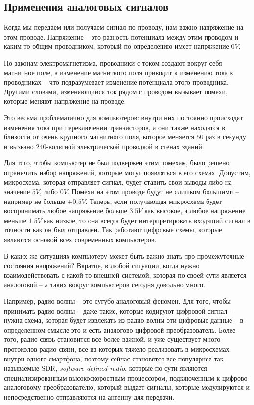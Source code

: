 \documentclass[a4page]{article}
\begin{document}
\subsection{Применения аналоговых сигналов}

Когда мы передаем или получаем сигнал по проводу, нам важно напряжение на этом проводе.
Напряжение -- это разность потенциала между этим проводом и каким-то общим проводником, который по определению имеет напряжение $0V$.

По законам электромагнетизма, проводники с током создают вокруг себя магнитное поле, а изменение магнитного поля приводит к изменению тока в проводниках -- 
что подразумевает изменение потенциала этого проводника.
Другими словами, изменяющийся ток рядом с проводом вызывает помехи, которые меняют напряжение на проводе.

Это весьма проблематично для компьютеров:
внутри них постоянно происходят изменения тока при переключении транзисторов,
а они также находятся в близости от очень крупного магнитного поля, которое меняется 50 раз в секунду и вызвано 240-вольтной электрической проводкой в стенах зданий.

Для того, чтобы компьютер не был подвержен этим помехам, было решено ограничить набор напряжений, которые могут появляться в его схемах.
Допустим, микросхема, которая отправляет сигнал, будет ставить свои выводы либо на значение $5V$, либо $0V$.
Помехи на этом проводе будут не слишком большими -- например не больше $\pm 0.5V$.
Теперь, если получающая микросхема будет воспринимать любое напряжение больше $3.5V$ как высокое,
а любое напряжение меньше $1.5V$ как низкое,
то она всегда будет интерпретировать входящий сигнал в точности как он был отправлен.
Так работают цифровые схемы, которые являются основой всех современных компьютеров.


В каких же ситуациях компьютеру может быть важно знать про промежуточные состояния напряжений?
Вкратце, в любой ситуации, когда нужно взаимодействовать с какой-то внешней системой, которая по своей сути является аналоговой --
а таких вокруг компьютеров сегодня довольно много. 

Например, радио-волны -- это сугубо аналоговый феномен. Для того, чтобы принимать радио-волны -- даже такие, которые кодируют цифровой сигнал -- 
нужна схема, которая будет извлекать из радио-волны эти цифровые данные -- в определенном смысле это и есть аналогово-цифровой преобразователь.
Более того, радио-связь становится все более важной, и уже существует много протоколов радио-связи,
все из которых тяжело реализовать в микросхемах внутри одного смартфона;
поэтому сейчас становятся все популярнее так называемые SDR, \emph{software-defined radio},
которые по сути являются специализированным высокоскоростным процессором, подключенным к цифрово-аналоговому преобразователю,
который выдает сигналы, которые модулируются и непосредственно отправляются на антенну для передачи.
\end{document}
